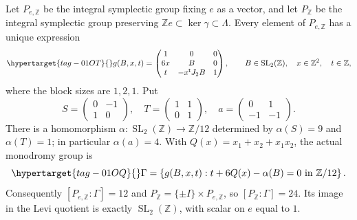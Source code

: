 \begin{theorem}\hypertarget{tag-01R9}{}\label{fam:src:F.1.1}\label{fam:st:F.1.1}\label{cdp:st:D.1.14}

Let $P_{e,\mathbb Z}$ be the integral symplectic group fixing $e$ as a
vector, and let $P_{\mathbb Z}$ be the integral symplectic group preserving
$\mathbb Ze\subset\ker\gamma\subset\Lambda$.  Every element of
$P_{e,\mathbb Z}$ has a unique expression
\begin{equation}\hypertarget{tag-01OT}{}\label{fam:eq:F-g}
 g(B,x,t)=
 \begin{pmatrix}
 1&0&0\\6x&B&0\\t&-x^{\mathsf t}J_2B&1
 \end{pmatrix},\qquad
 B\in\operatorname{SL}_2(\mathbb Z),\quad x\in\mathbb Z^2,\quad t\in\mathbb Z,
\end{equation}
where the block sizes are $1,2,1$.  Put
\[
 S=\begin{pmatrix}0&-1\\1&0\end{pmatrix},\quad
 T=\begin{pmatrix}1&1\\0&1\end{pmatrix},\quad
 a=\begin{pmatrix}0&1\\-1&-1\end{pmatrix}.
\]
There is a homomorphism
$\alpha:\operatorname{SL}_2(\mathbb Z)\to\mathbb Z/12$ determined by
$\alpha(S)=9$ and $\alpha(T)=1$; in particular $\alpha(a)=4$.
With $Q(x)=x_1+x_2+x_1x_2$, the actual monodromy group is
\begin{equation}\hypertarget{tag-01OQ}{}\label{fam:eq:F-Gamma}
 \Gamma=\left\{g(B,x,t):t+6Q(x)-\alpha(B)=0\ \text{in }\mathbb Z/12\right\}.
\end{equation}
Consequently $[P_{e,\mathbb Z}:\Gamma]=12$ and
$P_{\mathbb Z}=\{\pm I\}\times P_{e,\mathbb Z}$, so
$[P_{\mathbb Z}:\Gamma]=24$.  Its image in the Levi quotient is exactly
$\operatorname{SL}_2(\mathbb Z)$, with scalar on $e$ equal to $1$.
\end{theorem}



